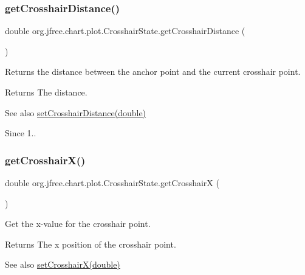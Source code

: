 \subsubsection{\texorpdfstring{get\+Crosshair\+Distance()}{getCrosshairDistance()}}
{\footnotesize\ttfamily double org.\+jfree.\+chart.\+plot.\+Crosshair\+State.\+get\+Crosshair\+Distance (\begin{DoxyParamCaption}{ }\end{DoxyParamCaption})}

Returns the distance between the anchor point and the current crosshair point.

\begin{DoxyReturn}{Returns}
The distance.
\end{DoxyReturn}
\begin{DoxySeeAlso}{See also}
\mbox{\hyperlink{classorg_1_1jfree_1_1chart_1_1plot_1_1_crosshair_state_aea6b9ca1f8b09694339619bf4e3dee87}{set\+Crosshair\+Distance(double)}} 
\end{DoxySeeAlso}
\begin{DoxySince}{Since}
1.. 
\end{DoxySince}
\mbox{\label{classorg_1_1jfree_1_1chart_1_1plot_1_1_crosshair_state_a76091d57e88b55dfdd83fef54fcdf453}} 
\subsubsection{\texorpdfstring{get\+Crosshair\+X()}{getCrosshairX()}}
{\footnotesize\ttfamily double org.\+jfree.\+chart.\+plot.\+Crosshair\+State.\+get\+CrosshairX (\begin{DoxyParamCaption}{ }\end{DoxyParamCaption})}

Get the x-\/value for the crosshair point.

\begin{DoxyReturn}{Returns}
The x position of the crosshair point.
\end{DoxyReturn}
\begin{DoxySeeAlso}{See also}
\mbox{\hyperlink{classorg_1_1jfree_1_1chart_1_1plot_1_1_crosshair_state_a14e7d9a337753cc7a70144d5f29d65a4}{set\+Crosshair\+X(double)}} 
\end{DoxySeeAlso}
\mbox{\label{classorg_1_1jfree_1_1chart_1_1plot_1_1_crosshair_state_a406ee4f64d870eb091754cd148d77f1c}} 
